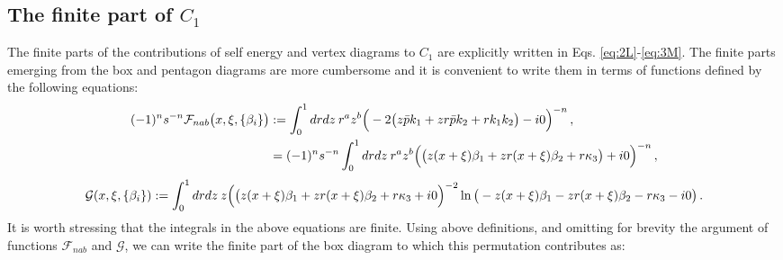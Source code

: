\documentclass[aps,prd,superscriptaddress,floatfix,showpacs]{revtex4}
\begin{document}
\subsection{The finite part of $C_1$}
\label{sec:finite}

The finite parts of the contributions of self energy and vertex diagrams to $C_1$ are explicitly written in Eqs. \eqref{eq:2L}-\eqref{eq:3M}. The finite parts emerging from the box and pentagon diagrams are more cumbersome and  it is convenient to write them in terms of functions defined by the following equations:
\begin{align}
(-1)^n s^{-n} \mathcal{F}_{nab}\big(x, \xi, \{ \beta_i \} \big) &:=
\int_0^1 dr dz \: r^{a}z^{b}\Big{(} -2\big{(} z\bar{p}k_1 + zr \bar{p}k_2 + r k_1 k_2 \big{)} - i0  \Big{)}^{-n}\,,
\nonumber \\
&= (-1)^n s^{-n} \int_0^1 dr dz \: r^{a}z^{b}\Big{(} \big{(} z(x+\xi)\beta_1 + zr (x+\xi)\beta_2 + r \kappa_3 \big{)} + i0  \Big{)}^{-n}\,, 
\end{align}
\begin{equation}
	\mathcal{G}(x, \xi, \{ \beta_i \}) := \int_0^1 dr dz\: z\Big{(} \big{(} z(x+\xi)\beta_1 + zr(x+\xi)\beta_2 + r\kappa_3 + i0  \Big{)}^{-2}\ln \big(- z(x+\xi)\beta_1 - zr(x+\xi)\beta_2 - r\kappa_3 - i0 \big)\,.
\end{equation}
It is worth stressing that the integrals in the above equations are finite. Using above definitions,  
and omitting for brevity the argument of functions $\mathcal{F}_{nab}$ and $\mathcal{G}$,
we can write the finite part of the box diagram to which this permutation contributes as:
\end{document}
